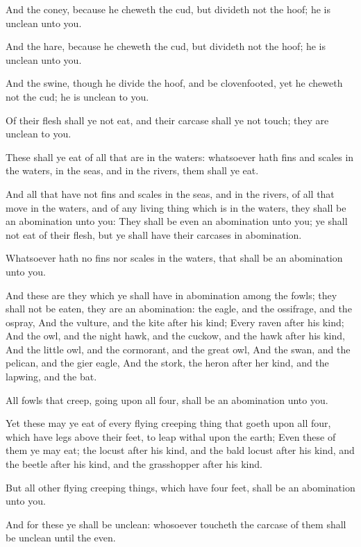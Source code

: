 \Verse And the coney, because he cheweth the cud, but divideth not the hoof; he is unclean unto you.

\Verse And the hare, because he cheweth the cud, but divideth not the hoof; he is unclean unto you.

\Verse And the swine, though he divide the hoof, and be clovenfooted, yet he cheweth not the cud; he is unclean to you.

\Verse Of their flesh shall ye not eat, and their carcase shall ye not touch; they are unclean to you.

\Verse These shall ye eat of all that are in the waters: whatsoever hath fins and scales in the waters, in the seas, and in the rivers, them shall ye eat.

\Verse And all that have not fins and scales in the seas, and in the rivers, of all that move in the waters, and of any living thing which is in the waters, they shall be an abomination unto you: \Verse They shall be even an abomination unto you; ye shall not eat of their flesh, but ye shall have their carcases in abomination.

\Verse Whatsoever hath no fins nor scales in the waters, that shall be an abomination unto you.

\Verse And these are they which ye shall have in abomination among the fowls; they shall not be eaten, they are an abomination: the eagle, and the ossifrage, and the ospray, \Verse And the vulture, and the kite after his kind; \Verse Every raven after his kind; \Verse And the owl, and the night hawk, and the cuckow, and the hawk after his kind, \Verse And the little owl, and the cormorant, and the great owl, \Verse And the swan, and the pelican, and the gier eagle, \Verse And the stork, the heron after her kind, and the lapwing, and the bat.

\Verse All fowls that creep, going upon all four, shall be an abomination unto you.

\Verse Yet these may ye eat of every flying creeping thing that goeth upon all four, which have legs above their feet, to leap withal upon the earth; \Verse Even these of them ye may eat; the locust after his kind, and the bald locust after his kind, and the beetle after his kind, and the grasshopper after his kind.

\Verse But all other flying creeping things, which have four feet, shall be an abomination unto you.

\Verse And for these ye shall be unclean: whosoever toucheth the carcase of them shall be unclean until the even.

